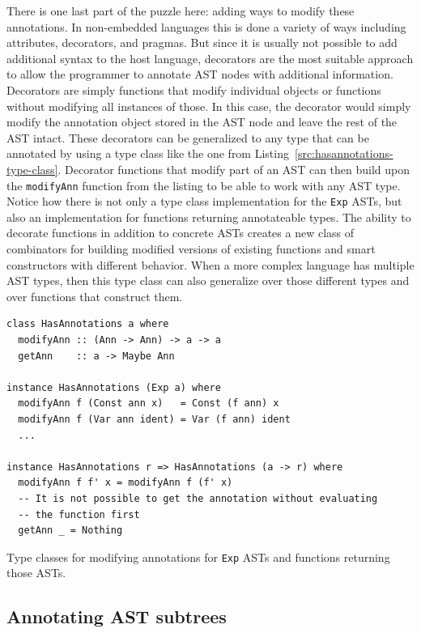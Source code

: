 \documentclass[fontsize=11pt,a4paper,parskip=half,numbers=noenddot]{scrartcl}
\newcommand{\hask}[1]{\texttt{#1}}
\begin{document}
There is one last part of the puzzle here: adding ways to modify these
annotations. In non-embedded languages this is done a variety of ways including
attributes, decorators, and pragmas. But since it is usually not possible to add
additional syntax to the host language, decorators are the most suitable
approach to allow the programmer to annotate AST nodes with additional
information. Decorators are simply functions that modify individual objects or
functions without modifying all instances of those. In this case, the decorator
would simply modify the annotation object stored in the AST node and leave the
rest of the AST intact. These decorators can be generalized to any type that
can be annotated by using a type class like the one from
Listing~\ref{src:hasannotations-type-class}. Decorator functions that modify
part of an AST can then build upon the \hask{modifyAnn} function from the
listing to be able to work with any AST type. Notice how there is not only a
type class implementation for the \hask{Exp} ASTs, but also an implementation
for functions returning annotateable types. The ability to decorate functions in
addition to concrete ASTs creates a new class of combinators for building
modified versions of existing functions and smart constructors with different
behavior. When a more complex language has multiple AST types, then this type
class can also generalize over those different types and over functions that
construct them.

\begin{listing}[!ht]
\begin{verbatim}
class HasAnnotations a where
  modifyAnn :: (Ann -> Ann) -> a -> a
  getAnn    :: a -> Maybe Ann

instance HasAnnotations (Exp a) where
  modifyAnn f (Const ann x)   = Const (f ann) x
  modifyAnn f (Var ann ident) = Var (f ann) ident
  ...

instance HasAnnotations r => HasAnnotations (a -> r) where
  modifyAnn f f' x = modifyAnn f (f' x)
  -- It is not possible to get the annotation without evaluating
  -- the function first
  getAnn _ = Nothing
\end{verbatim}
\caption{Type classes for modifying annotations for \hask{Exp} ASTs and functions returning those ASTs.}\label{src:hasannotations-type-class}
\end{listing}

\subsection{Annotating AST subtrees}\label{sec:annotations-subtrees}
\end{document}
